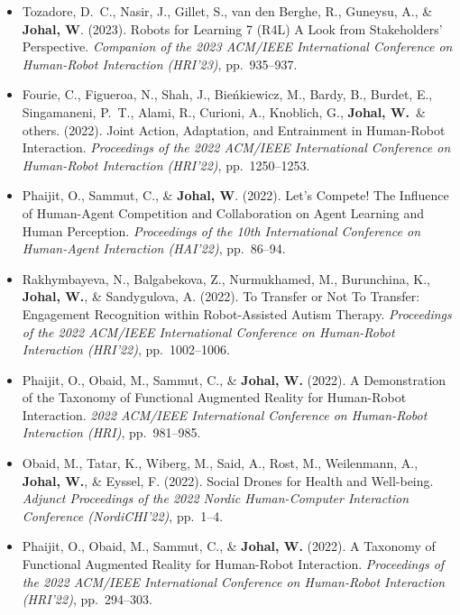 \begin{itemize}[nosep]
    \item Tozadore, D.\ C., Nasir, J., Gillet, S., van den Berghe, R., Guneysu, A., \& \textbf{Johal, W}. (2023). Robots for Learning 7 (R4L) A Look from Stakeholders' Perspective. \textit{Companion of the 2023 ACM/IEEE International Conference on Human-Robot Interaction (HRI'23)}, pp.\ 935--937.

    \item Fourie, C., Figueroa, N., Shah, J., Bieńkiewicz, M., Bardy, B., Burdet, E., Singamaneni, P.\ T., Alami, R., Curioni, A., Knoblich, G., \textbf{Johal, W.}\ \& others. (2022). Joint Action, Adaptation, and Entrainment in Human-Robot Interaction. \textit{Proceedings of the 2022 ACM/IEEE International Conference on Human-Robot Interaction (HRI'22)}, pp.\ 1250--1253.

    \item Phaijit, O., Sammut, C., \& \textbf{Johal, W}. (2022). Let's Compete! The Influence of Human-Agent Competition and Collaboration on Agent Learning and Human Perception. \textit{Proceedings of the 10th International Conference on Human-Agent Interaction (HAI'22)}, pp.\ 86--94.

    \item Rakhymbayeva, N., Balgabekova, Z., Nurmukhamed, M., Burunchina, K., \textbf{Johal, W.}, \& Sandygulova, A. (2022). To Transfer or Not To Transfer: Engagement Recognition within Robot-Assisted Autism Therapy. \textit{Proceedings of the 2022 ACM/IEEE International Conference on Human-Robot Interaction (HRI'22)}, pp.\ 1002--1006.

    \item Phaijit, O., Obaid, M., Sammut, C., \& \textbf{Johal, W.} (2022). A Demonstration of the Taxonomy of Functional Augmented Reality for Human-Robot Interaction. \textit{2022 ACM/IEEE International Conference on Human-Robot Interaction (HRI)}, pp.\ 981--985.

    \item Obaid, M., Tatar, K., Wiberg, M., Said, A., Rost, M., Weilenmann, A., \textbf{Johal, W.}, \& Eyssel, F. (2022). Social Drones for Health and Well-being. \textit{Adjunct Proceedings of the 2022 Nordic Human-Computer Interaction Conference (NordiCHI'22)}, pp.\ 1--4.

    \item Phaijit, O., Obaid, M., Sammut, C., \& \textbf{Johal, W.} (2022). A Taxonomy of Functional Augmented Reality for Human-Robot Interaction. \textit{Proceedings of the 2022 ACM/IEEE International Conference on Human-Robot Interaction (HRI'22)}, pp.\ 294--303.


\end{itemize}
